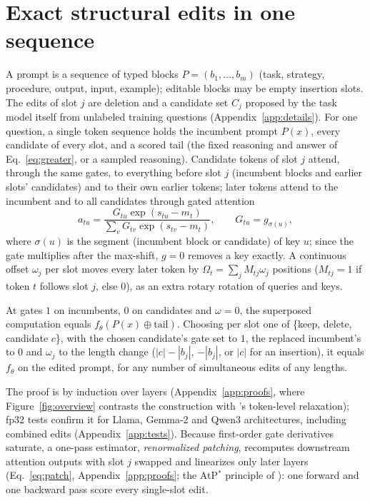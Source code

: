 \section{Exact structural edits in one sequence}
\label{sec:calculus}

A prompt is a sequence of typed blocks $P=(b_1,\dots,b_m)$ (task, strategy, procedure, output,
input, example); editable blocks may be empty insertion slots. The edits of slot $j$ are deletion
and a candidate set $C_j$ proposed by the task model itself from unlabeled training questions
(Appendix~\ref{app:details}). For one question, a single token sequence holds the incumbent prompt
$P(x)$, every candidate of every slot, and a scored tail (the fixed reasoning and answer of
Eq.~\ref{eq:greater}, or a sampled reasoning). Candidate tokens of slot $j$ attend, through the same
gates, to everything before slot $j$ (incumbent blocks and earlier slots' candidates) and to their
own earlier tokens; later tokens attend to the incumbent and to all candidates through gated attention
\begin{equation}
a_{tu}=\frac{G_{tu}\exp(s_{tu}-m_t)}{\sum_{v}G_{tv}\exp(s_{tv}-m_t)},\qquad G_{tu}=g_{\sigma(u)},
\label{eq:gate}
\end{equation}
where $\sigma(u)$ is the segment (incumbent block or candidate) of key $u$; since the gate
multiplies after the max-shift, $g=0$ removes a key exactly. A continuous offset $\omega_j$ per slot
moves every later token by $\Omega_t=\sum_j M_{tj}\omega_j$ positions ($M_{tj}=1$ if token $t$
follows slot $j$, else $0$), as an extra rotary rotation of queries and keys.

\begin{proposition}
\label{prop:vertices}
At gates $1$ on incumbents, $0$ on candidates and $\omega=0$, the superposed computation equals
$f_\theta(P(x)\oplus\text{tail})$. Choosing per slot one of \{keep, delete, candidate $c$\}, with
the chosen candidate's gate set to $1$, the replaced incumbent's to $0$ and $\omega_j$ to the
length change ($|c|-|b_j|$, $-|b_j|$, or $|c|$ for an insertion), it equals $f_\theta$ on the
edited prompt, for any number of simultaneous edits of any lengths.
\end{proposition}

The proof is by induction over layers (Appendix~\ref{app:proofs}, where Figure~\ref{fig:overview}
contrasts the construction with \greater{}'s token-level relaxation); fp32 tests confirm it for
Llama, Gemma-2 and Qwen3 architectures, including combined edits (Appendix~\ref{app:tests}).
Because first-order gate derivatives saturate, a one-pass estimator, \emph{renormalized patching},
recomputes downstream attention outputs with slot $j$ swapped and linearizes only later layers
(Eq.~\ref{eq:patch}, Appendix~\ref{app:proofs}; the AtP$^*$ principle of
\citealp{kramar2024atp}): one forward and one backward pass score every single-slot edit.
